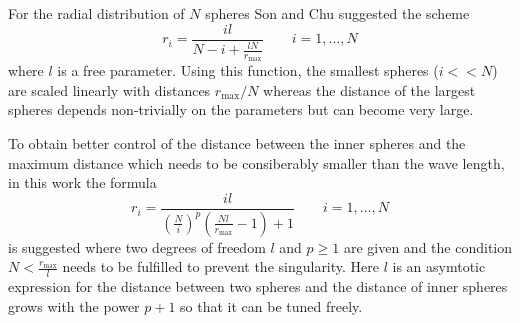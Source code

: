 For the radial distribution of $N$ spheres Son and Chu \cite{Son_Chu0} suggested the scheme
\begin{equation} \label{eq:son_map}
r_i=\frac{il}{N-i+\frac{lN}{r_\text{max}}} \qquad i=1,\hdots ,N 
\end{equation}
where $l$ is a free parameter.
Using this function, the smallest spheres ($i<<N$) are scaled linearly with distances $r_\text{max}/N$ whereas the distance of the largest spheres depends non-trivially on the parameters but can become very large.

To obtain better control of the distance between the inner spheres and the maximum distance which needs to be consiberably smaller than the wave length, in this work the formula
\begin{equation} \label{eq:tm_map}
r_i=\frac{il}{\left( \frac Ni \right)^p \left(\frac{Nl}{r_\text{max}}-1\right) +1} \qquad i=1,\hdots ,N 
\end{equation}
is suggested where two degrees of freedom $l$ and $p\geq 1$ are given and the condition $N<\frac{r_\text{max}}{l}$ needs to be fulfilled to prevent the singularity.
Here $l$ is an asymtotic expression for the distance between two spheres and the distance of inner spheres grows with the power $p+1$ so that it can be tuned freely.

